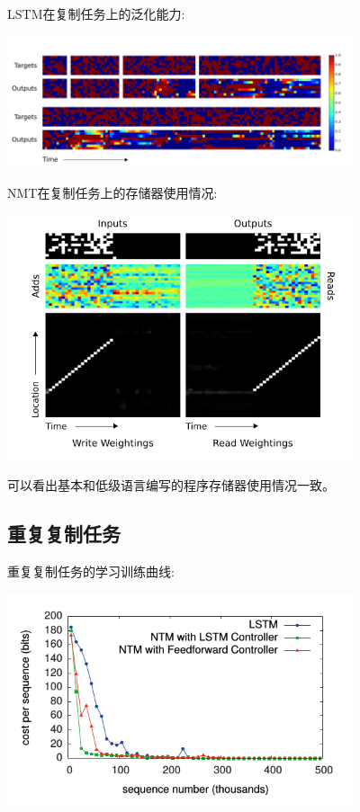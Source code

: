 \documentclass{article} %
\begin{document}
\begin{CJK*}{UTF8}{gkai}
LSTM在复制任务上的泛化能力:
\begin{center}
\includegraphics[width=4in]{lstm-generalisation-on-the-copy-task.png}
\end{center}

NMT在复制任务上的存储器使用情况:
\begin{center}
\includegraphics[width=4in]{nmt-memory-use-during-the-copy-task.png}
\end{center}
可以看出基本和低级语言编写的程序存储器使用情况一致。
\subsection{重复复制任务}
重复复制任务的学习训练曲线:
\begin{center}
\includegraphics[width=4in]{repeat-copy-learning-curves.png}
\end{center}


\end{CJK*}
\end{document}
